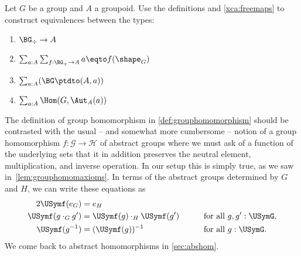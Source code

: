 

\begin{xca}\label{xca:BGtotype}
  Let $G$ be a group and $A$ a groupoid.  Use the definitions and
  \cref{xca:freemaps} to construct equivalences between the types:
  \begin{enumerate}
  \item $\BG_\div\to A$
  \item $\sum_{a:A}\sum_{f:\BG_\div \to A}a \eqto f(\shape_G)$
  \item $\sum_{a:A}(\BG\ptdto(A,a))$
  \item $\sum_{a:A}\Hom(G,\Aut_A(a))$\qedhere
  \end{enumerate}
\end{xca}

The definition of group homomorphism in \cref{def:grouphomomorphism} should be contrasted with the usual -- and somewhat more cumbersome -- notion of a group homomorphism $f\colon \mathcal G\to \mathcal H$ of abstract groups where we must ask of a function of the underlying sets that it in addition preserves the neutral element,
multiplication, and inverse operation.
In our setup this is simply true, as we saw in~\cref{lem:grouphomomaxioms}.
In terms of the abstract groups determined by $G$ and $H$, we can write these equations
as
\begin{alignat*}2
  \USymf ( e_G )
  &= e_H
  &\qquad& \\
  \USymf (g \cdot_G g') &= \USymf(g) \cdot_H \USymf(g')
  && \text{for all $g, g' : \USymG$,} \\
  \USymf (g ^ {-1})
  &= (\USymf (g))^{-1}
  && \text{for all $g : \USymG$.}
\end{alignat*}
We come back to abstract homomorphisms in \cref{sec:abshom}.

